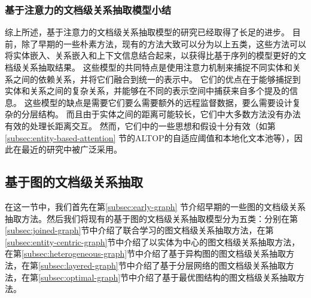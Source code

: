 \documentclass[bachelor]{thesis-uestc}
\begin{document}
\subsubsection{基于注意力的文档级关系抽取模型小结}

综上所述，基于注意力的文档级关系抽取模型的研究已经取得了长足的进步。
目前，除了早期的一些朴素方法，现有的方法大致可以分为以上五类，这些方法可以将实体嵌入、关系嵌入和上下文信息结合起来，以获得比基于序列的模型更好的文档级关系抽取结果。
这些模型的共同特点是使用注意力机制来捕捉不同实体和关系之间的依赖关系，并将它们融合到统一的表示中。
它们的优点在于能够捕捉到实体和关系之间的复杂关系，并能够在不同的表示空间中捕获来自多个提及的信息。
这些模型的缺点是需要它们要么需要额外的远程监督数据，要么需要设计复杂的分层结构。
而且由于实体之间的距离可能较长，它们中大多数方法没有办法有效的处理长距离交互。
然而，它们中的一些思想和假设十分有效（如第\ref{subsec:entity-based-attention} 节的ALTOP的自适应阈值和本地化文本池等），因此在最近的研究中被广泛采用。
\subsection{基于图的文档级关系抽取}
在这一节中，我们首先在第\ref{subsec:early-graph} 节介绍早期的一些图的文档级关系抽取方法。然后我们将现有的基于图的文档级关系抽取模型分为五类：分别在第\ref{subsec:joined-graph}节中介绍了联合学习的图文档级关系抽取方法，在第\ref{subsec:entity-centric-graph}节中介绍了以实体为中心的图文档级关系抽取方法，在第\ref{subsec:heterogeneous-graph}节中介绍了基于异构图的图文档级关系抽取方法，在第\ref{subsec:layered-graph}节中介绍了基于分层网络的图文档级关系抽取方法，在第\ref{subsec:optimal-graph}节中介绍了基于最优图结构的图文档级关系抽取方法。
\end{document}
